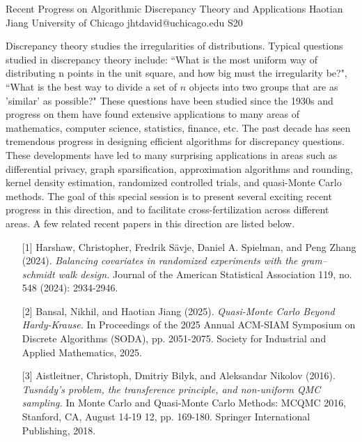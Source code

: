 \begin{session}
 {Recent Progress on Algorithmic Discrepancy Theory and Applications}%
 {Haotian Jiang}%
 {University of Chicago}%
 {jhtdavid@uchicago.edu}%
{}{}{}
 {S20}%
{}

 Discrepancy theory studies the irregularities of distributions. Typical questions studied in discrepancy theory include: ``What is the most uniform way of distributing n points in the unit square, and how big must the irregularity be?", ``What is the best way to divide a set of $n$ objects into two groups that are as 'similar' as possible?" These questions have been studied since the 1930s and progress on them have found extensive applications to many areas of mathematics, computer science, statistics, finance, etc.
 The past decade has seen tremendous progress in designing efficient algorithms for discrepancy questions. These developments have led to many surprising applications in areas such as differential privacy, graph sparsification, approximation algorithms and rounding, kernel density estimation, randomized controlled trials, and quasi-Monte Carlo methods.
 The goal of this special session is to present several exciting recent progress in this direction, and to facilitate cross-fertilization across different areas.
 \medskip
 A few related recent papers in this direction are listed below.
 \begin{enumerate}
 \item [{[1]}] Harshaw, Christopher, Fredrik Sävje, Daniel A. Spielman, and Peng Zhang (2024). {\it Balancing covariates in randomized experiments with the gram–schmidt walk design.} Journal of the American Statistical Association 119, no. 548 (2024): 2934-2946.
 \item[{[2]}] Bansal, Nikhil, and Haotian Jiang (2025). {\it Quasi-Monte Carlo Beyond Hardy-Krause.} In Proceedings of the 2025 Annual ACM-SIAM Symposium on Discrete Algorithms (SODA), pp. 2051-2075. Society for Industrial and Applied Mathematics, 2025.
 \item [{[3]}] Aistleitner, Christoph, Dmitriy Bilyk, and Aleksandar Nikolov (2016). {\it Tusnády’s problem, the transference principle, and non-uniform QMC sampling.} In Monte Carlo and Quasi-Monte Carlo Methods: MCQMC 2016, Stanford, CA, August 14-19 12, pp. 169-180. Springer International Publishing, 2018.
 \end{enumerate}
\end{session}

